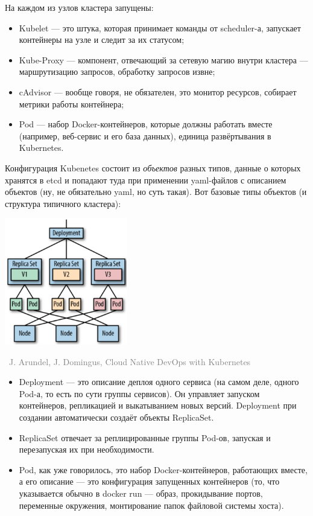 \documentclass[a5paper]{article}
\newcommand{\attribution}[1] {
    \vspace{-5mm}\begin{flushright}\begin{scriptsize}\textcolor{gray}{\textcopyright\, #1}\end{scriptsize}\end{flushright}
}
\begin{document}
На каждом из узлов кластера запущены:

\begin{itemize}
    \item Kubelet --- это штука, которая принимает команды от scheduler-а, запускает контейнеры на узле и следит за их статусом;
    \item Kube-Proxy --- компонент, отвечающий за сетевую магию внутри кластера --- маршрутизацию запросов, обработку запросов извне;
    \item cAdvisor --- вообще говоря, не обязателен, это монитор ресурсов, собирает метрики работы контейнера;
    \item Pod --- набор Docker-контейнеров, которые должны работать вместе (например, веб-сервис и его база данных), единица развёртывания в Kubernetes.
\end{itemize}

Конфигурация Kubenetes состоит из \emph{объектов} разных типов, данные о которых хранятся в etcd и попадают туда при применении yaml-файлов с описанием объектов (ну, не обязательно yaml, но суть такая). Вот базовые типы объектов (и структура типичного кластера):

\begin{center}
    \includegraphics[width=0.4\textwidth]{kubernetesObjects.png}
    \attribution{J. Arundel, J. Domingus, Cloud Native DevOps with Kubernetes}
\end{center}

\begin{itemize}
    \item Deployment --- это описание деплоя одного сервиса (на самом деле, одного Pod-а, то есть по сути группы сервисов). Он управляет запуском контейнеров, репликацией и выкатыванием новых версий. Deployment при создании автоматически создаёт объекты ReplicaSet.
    \item ReplicaSet отвечает за реплицированные группы Pod-ов, запуская и перезапуская их при необходимости.
    \item Pod, как уже говорилось, это набор Docker-контейнеров, работающих вместе, а его описание --- это конфигурация запущенных контейнеров (то, что указывается обычно в docker run --- образ, прокидывание портов, переменные окружения, монтирование папок файловой системы хоста).
\end{itemize}
\end{document}
